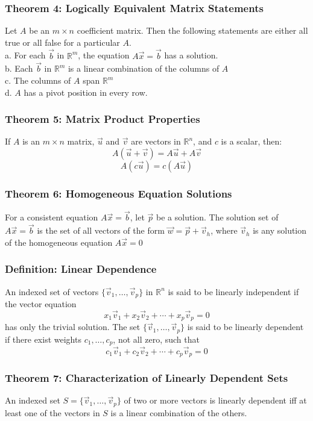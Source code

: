 \documentclass{article}
\begin{document}
\subsubsection*{Theorem 4: Logically Equivalent Matrix Statements}
Let $A$ be an $m \times n$ coefficient matrix. Then the following statements are either all true or all false for a particular $A$. 
\\\indent a. For each $\vec b$ in $\mathbb{R}^m$, the equation $A \vec x = \vec b$ has a solution.
\\\indent b. Each $\vec b$ in $\mathbb{R}^m$ is a linear combination of the columns of $A$
\\\indent c. The columns of $A$ span $\mathbb{R}^m$
\\\indent d. $A$ has a pivot position in every row. 
\subsubsection*{Theorem 5: Matrix Product Properties}
If $A$ is an $m \times n$ matrix, $\vec u$ and $\vec v$ are vectors in $\mathbb{R}^n$, and $c$ is a scalar, then:
$$A(\vec u + \vec v) = A \vec u + A \vec v$$
$$A(c \vec u) = c(A \vec u)$$

\subsubsection*{Theorem 6: Homogeneous Equation Solutions}
For a consistent equation $A\vec x = \vec b$, let $\vec p$ be a solution. The solution set of $A \vec x = \vec b$ is the set of all vectors of the form $\vec w = \vec p + \vec v_h$, where $\vec v_h$ is any solution of the homogeneous equation $A\vec x = 0$

\subsubsection*{Definition: Linear Dependence} 
An indexed set of vectors $\{\vec v_1, \dots, \vec v_p \}$ in $\mathbb{R}^n$ is said to be linearly independent if the vector equation 
$$x_1 \vec v_1 + x_2 \vec v_2 + \cdots + x_p \vec v_p = 0$$
has only the trivial solution. The set $\{\vec v_1, \dots, \vec v_p \}$ is said to be linearly dependent if there exist weights $c_1, \dots, c_p$, not all zero, such that 
$$c_1 \vec v_1  + c_2 \vec v_2 + \cdots + c_p \vec v_p  = 0$$

\subsubsection*{Theorem 7: Characterization of Linearly Dependent Sets}
An indexed set $S = \{ \vec v_1 , \dots , \vec v_p \}$ of two or more vectors is linearly dependent iff at least one of the vectors in $S$ is a linear combination of the others. 
\end{document}

